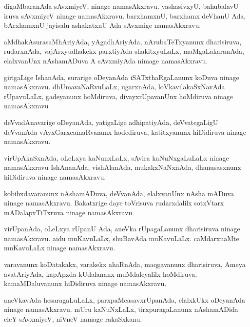 \documentclass{article}
\begin{document}
\begin{mn}
digaMbaranAda sAvxmiyeV, ninage namasAkxravu. yashasivxyU, bahubalavU
iruva  sAvxmiyeV ninage namasAkxravu. barxhamxnU, barxhamx deVhanU
Ada, bArxhamxnU jayisalu ashakatxnU Ada sAvxmige namasAkxravu.
\end{mn}

\begin{mn}
aMdhakAsurasaMhAriyAda, yAgadhAriyAda, nArubaTeTxyanunx dharisiruva,
rudarxnAda, vajArxyudhakekx parxtiyAda shakitxyuLaLx, maMgaLakaranAda,
elalxvanUnx nAshamADuva A sAvxmiyAda nimage namasAkxravu.
\end{mn}

\begin{mn}
girigaLige IshanAda, surarige oDeyanAda iSATxthaRgaLanunx koDuva
ninage namasAkxravu. dhUmavaNaRvuLaLx, ugarxnAda, loVkavilakaSxNavAda
rUpavuLaLx, gadeyanunx hoMdiruva, divayxrUpavanUnx hoMdiruva ninage namasAkxravu
\end{mn}

\begin{mn}
deVvadAnavarige oDeyanAda, yatigaLige adhipatiyAda, deVvategaLigU
deVvanAda vAyxGarxcamaRvanunx hodediruva, katitxyanunx hiDidiruva
ninage namasAkxravu.
\end{mn}

\begin{mn}%
virUpAkaSxnAda, oLeLxya kaNunxLaLx, sAvira kaNuNxgaLuLaLx ninage
namasAkxravu IshAnanAda, vishAlanAda, mukakxNaNxnAda, dhanusasxnunx
hiDidiruva ninage namasAkxravu.
\end{mn}

\begin{mn}%
kobibxdavaranunx nAshamADuva, deVvanAda, elalxvanUnx nAsha mADuva
ninage namasAkxravu. Bakatxrige daye toVrisuva rudarxdalilx sotxVtarx
mADalapxTiTxruva ninage namasAkxravu.
\end{mn}

\begin{mn}
virUpanAda, oLeLxya rUpanU Ada, aneVka rUpagaLanunx dharisiruva ninage
namasAkxravu. aidu muKavuLaLx, shuBavAda muKavuLaLx. caMdarxnaMte
muKavuLaLx ninage namasAkxravu.
\end{mn}

\begin{mn}
varavanunx koDatakakx, varakekx ahaRnAda, maqgavanunx dharisiruva,
Ameya avatAriyAda, kapApxda kUdalananx muMdaleyalilx hoMdiruva,
kamaMDaluvanunx hiDidiruva ninage namasAkxravu.
\end{mn}

\begin{mn}
aneVkavAda hesaragaLuLaLx, parxpaMcasavxrUpanAda, elalxkUkx oDeyanAda
ninage namasAkxravu. mUru kaNuNxLaLx, tirxpuragaLanunx nAshamADida
eleY sAvxmiyeV, niVneV namage rakaSxkanu.
\end{mn}
\end{document}
